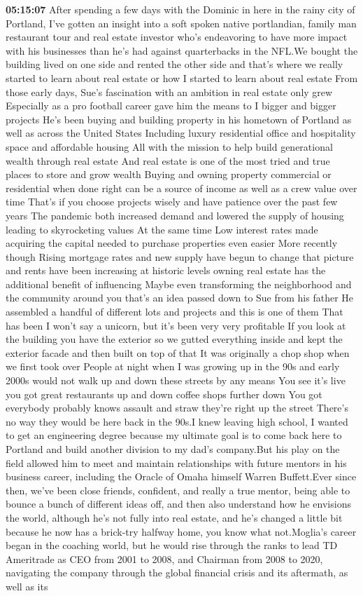 \documentclass{article}%
\begin{document}
\textbf{05:15:07}%
After spending a few days with the Dominic in here in the rainy city of Portland, I've gotten an insight into a soft spoken native portlandian, family man restaurant tour and real estate investor who's endeavoring to have more impact with his businesses than he's had against quarterbacks in the NFL.We bought the building lived on one side and rented the other side and that's where we really started to learn about real estate or how I started to learn about real estate From those early days, Sue's fascination with an ambition in real estate only grew Especially as a pro football career gave him the means to I bigger and bigger projects He's been buying and building property in his hometown of Portland as well as across the United States Including luxury residential office and hospitality space and affordable housing All with the mission to help build generational wealth through real estate And real estate is one of the most tried and true places to store and grow wealth Buying and owning property commercial or residential when done right can be a source of income as well as a crew value over time That's if you choose projects wisely and have patience over the past few years The pandemic both increased demand and lowered the supply of housing leading to skyrocketing values At the same time Low interest rates made acquiring the capital needed to purchase properties even easier More recently though Rising mortgage rates and new supply have begun to change that picture and rents have been increasing at historic levels owning real estate has the additional benefit of influencing Maybe even transforming the neighborhood and the community around you that's an idea passed down to Sue from his father He assembled a handful of different lots and projects and this is one of them That has been I won't say a unicorn, but it's been very very profitable If you look at the building you have the exterior so we gutted everything inside and kept the exterior facade and then built on top of that It was originally a chop shop when we first took over People at night when I was growing up in the 90s and early 2000s would not walk up and down these streets by any means You see it's live you got great restaurants up and down coffee shops further down You got everybody probably knows assault and straw they're right up the street There's no way they would be here back in the 90s.I knew leaving high school, I wanted to get an engineering degree because my ultimate goal is to come back here to Portland and build another division to my dad's company.But his play on the field allowed him to meet and maintain relationships with future mentors in his business career, including the Oracle of Omaha himself Warren Buffett.Ever since then, we've been close friends, confident, and really a true mentor, being able to bounce a bunch of different ideas off, and then also understand how he envisions the world, although he's not fully into real estate, and he's changed a little bit because he now has a brick{-}try halfway home, you know what not.Moglia's career began in the coaching world, but he would rise through the ranks to lead TD Ameritrade as CEO from 2001 to 2008, and Chairman from 2008 to 2020, navigating the company through the global financial crisis and its aftermath, as well as its 
\end{document}
